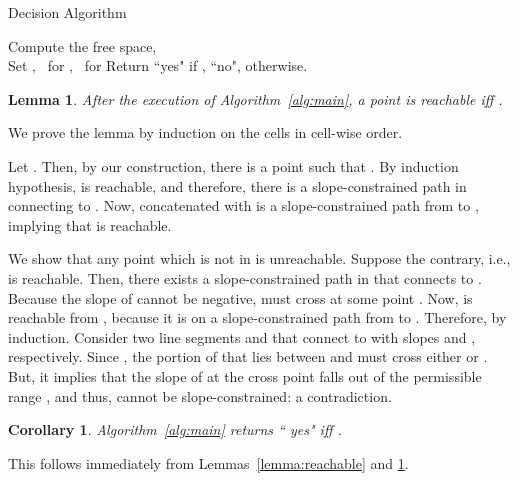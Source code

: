 \documentclass[12pt]{dalthesis}
\def\favoritefont{\bfseries \sffamily}
\def\QED{\ensuremath{{\Box}}}
\def\markatright#1{\leavevmode\unskip\nobreak\quad\hspace*{\fill}{#1}}
\newenvironment{proof}
	{\begin{trivlist}\item[\hskip\labelsep{\favoritefont Proof:}]}
	{\markatright{\QED}\end{trivlist}}
\newtheorem{lemma}[theorem]{Lemma}
\newtheorem{corollary}[theorem]{Corollary}
\newcommand{\SC}{slope-constrained }
\begin{document}
\vspace{0.5em}
\begin{algorithm} [h]
\caption {\sc Decision Algorithm} \label{alg:main}
\begin{algorithmic}[1]
	\vspace{0.5em}
	\baselineskip

	\STATE Compute the free space,  \\
	\STATE Set , \ 
		 for , \ 
		 for   
			\STATE\label{lp:1}   
			\STATE\label{lp:2}   
			\STATE\label{lp:3}  
			\STATE\label{lp:4}  
		\ENDFOR
	\ENDFOR
	\STATE\label{line:last} Return 
``{\sc yes}" if , 
``{\sc no}", otherwise. 

\end{algorithmic}
\end{algorithm}
\vspace{0.5em}




\begin{lemma} \label{lemma:cell-process}
After the execution of Algorithm~\ref{alg:main}, 
	a point  is reachable 	
	iff .
\end{lemma}

\begin{proof}
	We prove the lemma by induction on the cells in cell-wise order.
	 
	Let .
	Then, by our construction, there is a point 
	such that .
	By induction hypothesis,  is reachable, and therefore,
	there is a \SC path  in  connecting  to .
	Now,  concatenated with  is a slope-constrained path from  to , 
	implying that  is reachable.
	 
	We show that any point  which is not in  is unreachable.
	Suppose the contrary, i.e.,  is reachable.
	Then, there exists a \SC path  in  that connects  to .
	Because the slope of  cannot be negative,  must
	cross  at some point .
	Now,  is reachable from , because it is on a \SC path from  to .
	Therefore,  by induction.
	Consider two line segments  and  that connect  to 
	with slopes  and , respectively.
	Since ,
	the portion of  that lies between  and  must cross either  or .
	But, it implies that the slope of  at the cross point falls out of the permissible range ,
	and thus,  cannot be slope-constrained: a contradiction.
\end{proof}

\begin{corollary} \label{cor:correctness}
	Algorithm~\ref{alg:main} returns 
`` {\sc yes}" iff .
\end{corollary}
\begin{proof}
	This follows immediately from Lemmas~\ref{lemma:reachable} and \ref{lemma:cell-process}.
\end{proof}
\end{document}
